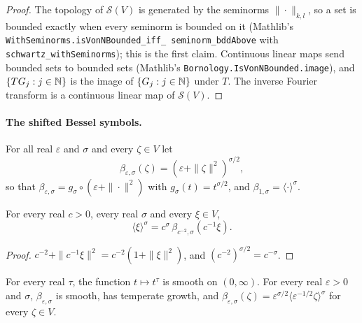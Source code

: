 \begin{proof}
\leanok
The topology of $\mathcal S(V)$ is generated by the seminorms $\|\cdot\|_{k,l}$, so a set is
bounded exactly when every seminorm is bounded on it (Mathlib's
\texttt{WithSeminorms.\allowbreak isVonNBounded\_\allowbreak iff\_\allowbreak
seminorm\_\allowbreak bddAbove} with \texttt{schwartz\_\allowbreak withSeminorms}); this is the
first claim. Continuous linear maps send bounded sets to bounded sets (Mathlib's
\texttt{Bornology.\allowbreak IsVonNBounded.\allowbreak image}), and $\{T G_j : j \in \mathbb{N}\}$ is
the image of $\{G_j : j \in \mathbb{N}\}$ under $T$. The inverse Fourier transform is a continuous linear
map of $\mathcal S(V)$.
\end{proof}

\paragraph{The shifted Bessel symbols.}

\begin{definition}
\label{def:shifted-bessel-symbol}
\leanok
{}
For all real $\varepsilon$ and $\sigma$ and every $\zeta \in V$ let
\[
  \beta_{\varepsilon,\sigma}(\zeta) = (\varepsilon + \|\zeta\|^2)^{\sigma/2} ,
\]
so that $\beta_{\varepsilon,\sigma} = g_\sigma \circ (\varepsilon + \|\cdot\|^2)$ with
$g_\sigma(t) = t^{\sigma/2}$, and $\beta_{1,\sigma} = \langle \cdot \rangle^\sigma$.
\end{definition}

\begin{lemma}
\label{lem:bessel-weight-scaling}
\leanok
{}
For every real $c > 0$, every real $\sigma$ and every $\xi \in V$,
\[
  \langle \xi \rangle^\sigma = c^\sigma \, \beta_{c^{-2},\sigma}(c^{-1} \xi) .
\]
\end{lemma}

\begin{proof}
\leanok
$c^{-2} + \|c^{-1} \xi\|^2 = c^{-2} (1 + \|\xi\|^2)$, and
$(c^{-2})^{\sigma/2} = c^{-\sigma}$.
\end{proof}

\begin{lemma}
\label{lem:shifted-bessel-symbol-smooth}
\leanok
{}
For every real $\tau$, the function $t \mapsto t^\tau$ is smooth on $(0, \infty)$. For every
real $\varepsilon > 0$ and $\sigma$, $\beta_{\varepsilon,\sigma}$ is smooth, has temperate growth,
and $\beta_{\varepsilon,\sigma}(\zeta) = \varepsilon^{\sigma/2} \langle \varepsilon^{-1/2} \zeta
\rangle^\sigma$ for every $\zeta \in V$.
\end{lemma}

